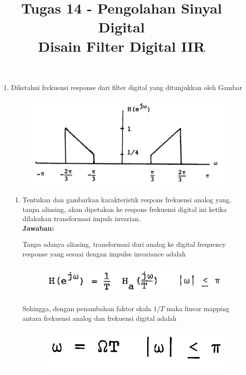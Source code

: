\documentclass[12pt,a4paper]{article}
\title{Tugas 14 - Pengolahan Sinyal Digital\\
	Disain Filter Digital IIR}
\date{}
\begin{document}
	\maketitle
	\date{}
	\begin{enumerate}
		\item Diketahui frekuensi response dari filter digital yang ditunjukkan oleh Gambar 
		
		\begin{figure}[H]
			\centering
			\includegraphics[width=0.7\linewidth]{img/img01}
		\end{figure}
		
		\begin{enumerate}
			\item\label{1a} Tentukan dan gambarkan karakteristik respons frekuensi analog yang, tanpa aliasing, akan dipetakan ke respons frekuensi digital ini ketika dilakukan transformasi impuls invarian.\\
			
			\textbf{Jawaban:}
			
			Tanpa adanya aliasing, transformasi dari analog ke digital frequency response yang sesuai dengan impulse invariance adalah
			
			\begin{figure}[H]
				\centering
				\includegraphics[width=0.5\linewidth]{img/img02}
			\end{figure}
		
			Sehingga, dengan penambahan faktor skala $ 1/T $ maka linear mapping antara frekuensi analog dan frekuensi digital adalah
			
			\begin{figure}[H]
				\centering
				\includegraphics[width=0.3\linewidth]{img/img03}
			\end{figure}
			

\end{enumerate}
\end{enumerate}
\end{document}

